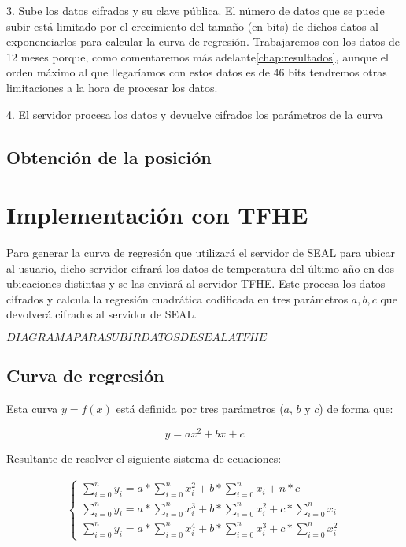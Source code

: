 3. Sube los datos cifrados y su clave pública. El número de datos que se puede subir está limitado por el crecimiento del tamaño (en bits) de dichos datos al exponenciarlos para calcular la curva de regresión. Trabajaremos con los datos de 12 meses porque, como comentaremos más adelante\ref{chap:resultados}, aunque el orden máximo al que llegaríamos con estos datos es de 46 bits tendremos otras limitaciones a la hora de procesar los datos.

4. El servidor procesa los datos y devuelve cifrados los parámetros de la curva

\subsection{Obtención de la posición}



\section{Implementación con TFHE}

Para generar la curva de regresión que utilizará el servidor de SEAL para ubicar al usuario, dicho servidor cifrará los datos de temperatura del último año en dos ubicaciones distintas y se las enviará al servidor TFHE. Este procesa los datos cifrados y calcula la regresión cuadrática codificada en tres parámetros $a, b, c$ que devolverá cifrados al servidor de SEAL.

$ DIAGRAMA PARA SUBIR DATOS DE SEAL A TFHE$

\subsection{Curva de regresión}

Esta curva $ y = f(x) $ está definida por tres parámetros ($a$, $b$ y $c$) de forma que:

\[ y = ax^2 + bx + c \]

Resultante de resolver el siguiente sistema de ecuaciones:

\begin{gather*}
    \begin{cases}
        \sum_{i=0}^n y_i = a*\sum_{i=0}^n x_i^2 + b*\sum_{i=0}^n x_i + n*c \\
        \sum_{i=0}^n y_i = a*\sum_{i=0}^n x_i^3 + b*\sum_{i=0}^n x_i^2 + c*\sum_{i=0}^n x_i \\
        \sum_{i=0}^n y_i = a*\sum_{i=0}^n x_i^4 + b*\sum_{i=0}^n x_i^3 + c*\sum_{i=0}^n x_i^2
    \end{cases}
\end{gather*}

